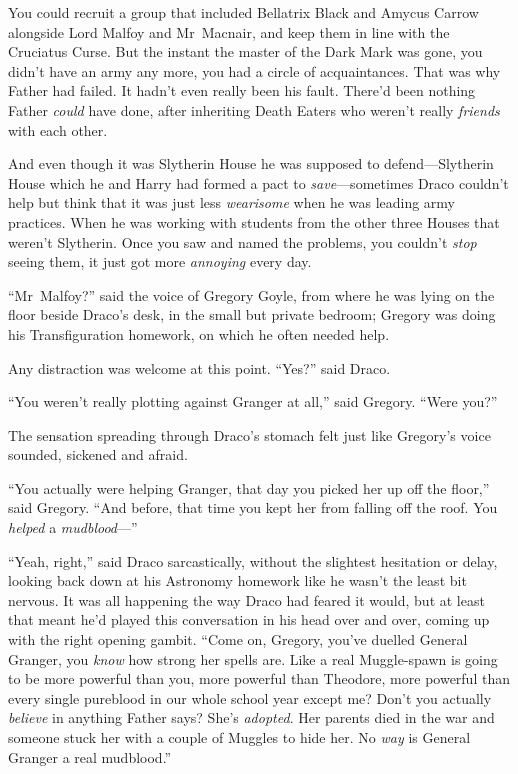 You could recruit a group that included Bellatrix Black and Amycus Carrow alongside Lord Malfoy and Mr~Macnair, and keep them in line with the Cruciatus Curse. But the instant the master of the Dark Mark was gone, you didn’t have an army any more, you had a circle of acquaintances. That was why Father had failed. It hadn’t even really been his fault. There’d been nothing Father \emph{could} have done, after inheriting Death Eaters who weren’t really \emph{friends} with each other.

And even though it was Slytherin House he was supposed to defend—Slytherin House which he and Harry had formed a pact to \emph{save}—sometimes Draco couldn’t help but think that it was just less \emph{wearisome} when he was leading army practices. When he was working with students from the other three Houses that weren’t Slytherin. Once you saw and named the problems, you couldn’t \emph{stop} seeing them, it just got more \emph{annoying} every day.

“Mr~Malfoy?” said the voice of Gregory Goyle, from where he was lying on the floor beside Draco’s desk, in the small but private bedroom; Gregory was doing his Transfiguration homework, on which he often needed help.

Any distraction was welcome at this point. “Yes?” said Draco.

“You weren’t really plotting against Granger at all,” said Gregory. “Were you?”

The sensation spreading through Draco’s stomach felt just like Gregory’s voice sounded, sickened and afraid.

“You actually were helping Granger, that day you picked her up off the floor,” said Gregory. “And before, that time you kept her from falling off the roof. You \emph{helped} a \emph{mudblood}—”

“Yeah, right,” said Draco sarcastically, without the slightest hesitation or delay, looking back down at his Astronomy homework like he wasn’t the least bit nervous. It was all happening the way Draco had feared it would, but at least that meant he’d played this conversation in his head over and over, coming up with the right opening gambit. “Come on, Gregory, you’ve duelled General Granger, you \emph{know} how strong her spells are. Like a real Muggle-spawn is going to be more powerful than you, more powerful than Theodore, more powerful than every single pureblood in our whole school year except me? Don’t you actually \emph{believe} in anything Father says? She’s \emph{adopted}. Her parents died in the war and someone stuck her with a couple of Muggles to hide her. No \emph{way} is General Granger a real mudblood.”


